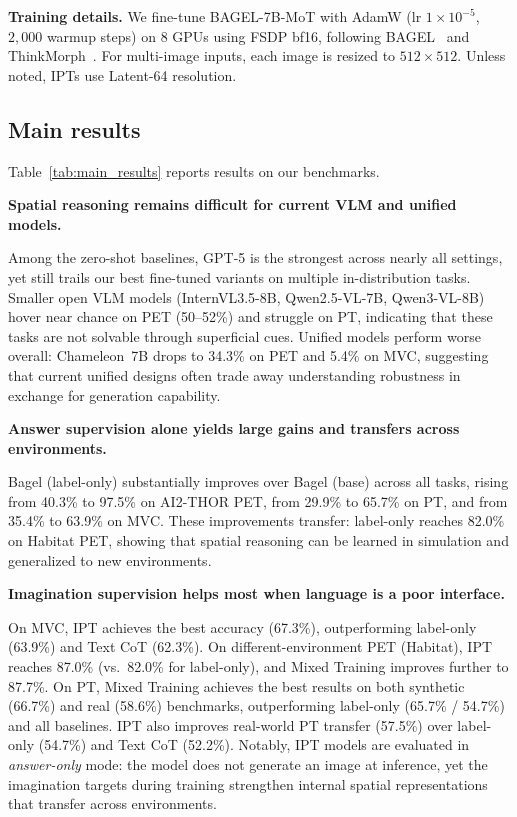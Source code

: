 \noindent\textbf{Training details.}
We fine-tune BAGEL-7B-MoT with AdamW (lr $1{\times}10^{-5}$, $2{,}000$ warmup steps) on $8$ GPUs using FSDP bf16, following BAGEL~\cite{deng2025bagel} and ThinkMorph~\cite{gu2025thinkmorph}.
For multi-image inputs, each image is resized to $512{\times}512$.
Unless noted, IPTs use Latent-64 resolution.
\vspace{-0.5em}
\subsection{Main results}

Table~\ref{tab:main_results} reports results on our benchmarks.

\begin{takeawayblock}
    \textbf{Spatial reasoning remains difficult for current VLM and unified models.}
\end{takeawayblock}
Among the zero-shot baselines, GPT-5 is the strongest across nearly all settings, yet still trails our best fine-tuned variants on multiple in-distribution tasks.
Smaller open VLM models (InternVL3.5-8B, Qwen2.5-VL-7B, Qwen3-VL-8B) hover near chance on PET (50--52\%) and struggle on PT, indicating that these tasks are not solvable through superficial cues.
Unified models perform worse overall: Chameleon~7B drops to 34.3\% on PET and 5.4\% on MVC, suggesting that current unified designs often trade away understanding robustness in exchange for generation capability.

\begin{takeawayblock}
    \textbf{Answer supervision alone yields large gains and transfers across environments.}
\end{takeawayblock}
Bagel (label-only) substantially improves over Bagel (base) across all tasks, rising from 40.3\% to 97.5\% on AI2-THOR PET, from 29.9\% to 65.7\% on PT, and from 35.4\% to 63.9\% on MVC.
These improvements transfer: label-only reaches 82.0\% on Habitat PET, showing that spatial reasoning can be learned in simulation and generalized to new environments.

\begin{takeawayblock}
    \textbf{Imagination supervision helps most when language is a poor interface.}
\end{takeawayblock}
On MVC, IPT achieves the best accuracy (67.3\%), outperforming label-only (63.9\%) and Text CoT (62.3\%).
On different-environment PET (Habitat), IPT reaches 87.0\% (vs.\ 82.0\% for label-only), and Mixed Training improves further to 87.7\%.
On PT, Mixed Training achieves the best results on both synthetic (66.7\%) and real (58.6\%) benchmarks, outperforming label-only (65.7\% / 54.7\%) and all baselines.
IPT also improves real-world PT transfer (57.5\%) over label-only (54.7\%) and Text CoT (52.2\%).
Notably, IPT models are evaluated in \emph{answer-only} mode: the model does not generate an image at inference, yet the imagination targets during training strengthen internal spatial representations that transfer across environments.


